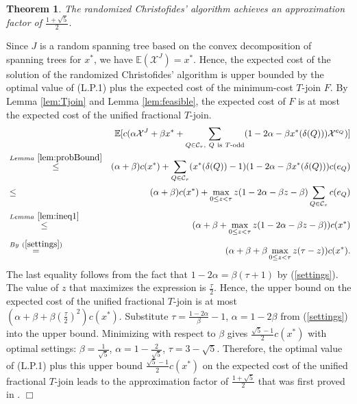 \documentclass[11pt]{article}
\newcommand{\qed}{\hspace*{\fill}$\Box$}
\newtheorem{theorem}{Theorem}[section]
\newenvironment{proof}[1][Proof. ]{\noindent {\bf #1 }}{\qed}
\begin{document}
\begin{theorem}\cite{AKS12}\label{thm:AKS}
The randomized Christofides' algorithm achieves an
approximation factor of $\frac{1+\sqrt{5}}{2}$.
\end{theorem}
\begin{proof}
Since $J$ is a random spanning tree based on the convex decomposition of spanning trees for $x^*$, we have $\mathbb{E}(\mathcal{X}^J)=x^*$. Hence, the expected cost of the solution of the randomized
Christofides' algorithm is upper bounded by the optimal value of (L.P.1) plus the expected cost of the
minimum-cost $T$-join $F$. By Lemma \ref{lem:Tjoin} and Lemma \ref{lem:feasible}, the expected cost of $F$ is
at most the expected cost of the unified fractional $T$-join.
\begin{eqnarray}
&&\mathbb{E}[ c(\alpha \mathcal{X}^J+ \beta x^* + \sum_{Q\in \mathcal{C}_\tau,\ Q\ \textnormal{is} \ T\textnormal{-odd}} (1-2\alpha -\beta x^*(\delta(Q)))\mathcal{X}^{e_{Q}}) ] \nonumber \\
 &\stackrel{Lemma\ \ref{lem:probBound}}{\leq}& (\alpha+\beta)c(x^*)+\sum_{Q\in \mathcal{C}_\tau}(x^*(\delta(Q))-1)(1-2\alpha -\beta x^*(\delta(Q)))c(e_Q) \nonumber \\
 &\leq & (\alpha+\beta)c(x^*)+  \max_{0\leq z<\tau}z(1-2\alpha-\beta z-\beta)\sum_{Q\in \mathcal{C}_\tau}c(e_Q) \nonumber \\
  &\stackrel{Lemma \ \ref{lem:ineq1}}{\leq}&(\alpha+\beta+\max_{0\leq z<\tau}z(1-2\alpha-\beta z-\beta))c(x^*)\nonumber \\
  &\stackrel{ By \ (\ref{settings})}{=}&(\alpha+\beta+\beta\max_{0\leq z<\tau}z(\tau-z))c(x^*).\nonumber
\end{eqnarray}
The last equality follows from the fact that $1-2\alpha=\beta(\tau+1)$ by (\ref{settings}). The value of $z$ that maximizes
the expression is $\frac{\tau}{2}$. Hence, the upper bound on the expected cost of the unified fractional
$T$-join is at most $(\alpha + \beta + \beta(\frac{\tau}{2})^2)c(x^*)$. Substitute $\tau=\frac{1-2\alpha}{\beta}-1$, $\alpha =1- 2\beta$ from (\ref{settings}) into the upper bound.
Minimizing with respect to $\beta$ gives $\frac{\sqrt{5}-1}{2}c(x^*)$ with optimal settings:  $\beta=\frac{1}{\sqrt{5}}$,
$\alpha=1-\frac{2}{\sqrt{5}}$, $\tau=3-\sqrt{5}$.
Therefore, the optimal value of (L.P.1) plus this upper bound $\frac{\sqrt{5}-1}{2}c(x^*)$ on the expected cost of the unified fractional $T$-join leads to
the approximation factor of
$\frac{1+\sqrt{5}}{2}$ that was first proved in \cite{AKS12}.
\end{proof}
\end{document}
